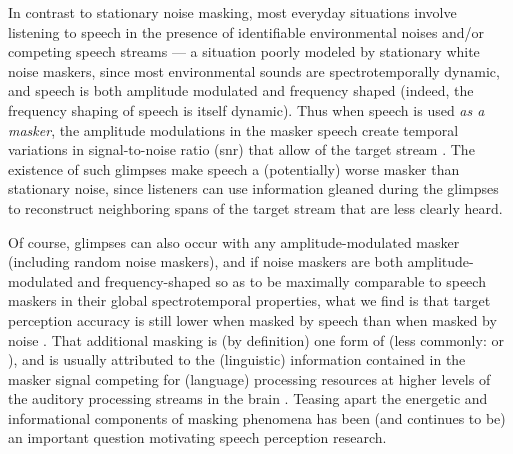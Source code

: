 \label{par:Glimpsing}In contrast to stationary noise masking, most everyday situations involve listening to speech in the presence of identifiable environmental noises and/or competing speech streams — a situation poorly modeled by stationary white noise maskers, since most environmental sounds are spectrotemporally dynamic, and speech is both amplitude modulated and frequency shaped (indeed, the frequency shaping of speech is itself dynamic).  Thus when speech is used \emph{as a masker}, the amplitude modulations in the masker speech create temporal variations in signal-to-noise ratio (\ac{snr}) that allow  of the target stream \citep[\etseq]{FestenPlomp1990}.  The existence of such glimpses make speech a (potentially) worse masker than stationary noise, since listeners can use information gleaned during the glimpses to reconstruct neighboring spans of the target stream that are less clearly heard.\footnotemark{}  


Of course, glimpses can also occur with any amplitude-modulated masker (including random noise maskers), and if noise maskers are both amplitude-modulated and frequency-shaped so as to be maximally comparable to speech maskers in their global spectrotemporal properties, what we find is that target perception accuracy is still lower when masked by speech than when masked by noise \citep[\intal]{CarhartEtAl1969,LewisEtAl1988,SimpsonCooke2005}.  That additional masking is (by definition) one form of  (less commonly:  or ), and is usually attributed to the (linguistic) information contained in the masker signal competing for (language) processing resources at higher levels of the auditory processing streams in the brain \citep{DurlachEtAl2003a}.  Teasing apart the energetic and informational components of masking phenomena has been (and continues to be) an important question motivating speech perception research.

